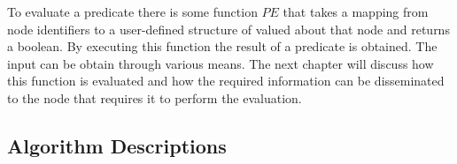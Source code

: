 To evaluate a predicate there is some function $PE$ that takes a mapping from node identifiers to a user-defined structure of valued about that node and returns a boolean. By executing this function the result of a predicate is obtained. The input can be obtain through various means. The next chapter will discuss how this function is evaluated and how the required information can be disseminated to the node that requires it to perform the evaluation.

\subsection{Algorithm Descriptions}


